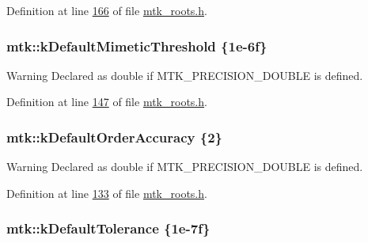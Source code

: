 Definition at line \hyperlink{mtk__roots_8h_source_l00166}{166} of file \hyperlink{mtk__roots_8h_source}{mtk\-\_\-roots.\-h}.

\hypertarget{group__c01-roots_ga35718d949bdc81a08a9cc8ebbe3478a2}{
\subsubsection[{k\-Default\-Mimetic\-Threshold}]{\setlength{\rightskip}{0pt plus 5cm}mtk\-::k\-Default\-Mimetic\-Threshold \{1e-\/6f\}}}\label{group__c01-roots_ga35718d949bdc81a08a9cc8ebbe3478a2}
\begin{DoxyWarning}{Warning}
Declared as double if M\-T\-K\-\_\-\-P\-R\-E\-C\-I\-S\-I\-O\-N\-\_\-\-D\-O\-U\-B\-L\-E is defined. 
\end{DoxyWarning}


Definition at line \hyperlink{mtk__roots_8h_source_l00147}{147} of file \hyperlink{mtk__roots_8h_source}{mtk\-\_\-roots.\-h}.

\hypertarget{group__c01-roots_ga0d95560098eb36420511103637b6952f}{
\subsubsection[{k\-Default\-Order\-Accuracy}]{\setlength{\rightskip}{0pt plus 5cm}mtk\-::k\-Default\-Order\-Accuracy \{2\}}}\label{group__c01-roots_ga0d95560098eb36420511103637b6952f}
\begin{DoxyWarning}{Warning}
Declared as double if M\-T\-K\-\_\-\-P\-R\-E\-C\-I\-S\-I\-O\-N\-\_\-\-D\-O\-U\-B\-L\-E is defined. 
\end{DoxyWarning}


Definition at line \hyperlink{mtk__roots_8h_source_l00133}{133} of file \hyperlink{mtk__roots_8h_source}{mtk\-\_\-roots.\-h}.

\hypertarget{group__c01-roots_gae914b125d81d1b97e0aee7bbc7739786}{
\subsubsection[{k\-Default\-Tolerance}]{\setlength{\rightskip}{0pt plus 5cm}mtk\-::k\-Default\-Tolerance \{1e-\/7f\}}}\label{group__c01-roots_gae914b125d81d1b97e0aee7bbc7739786}


